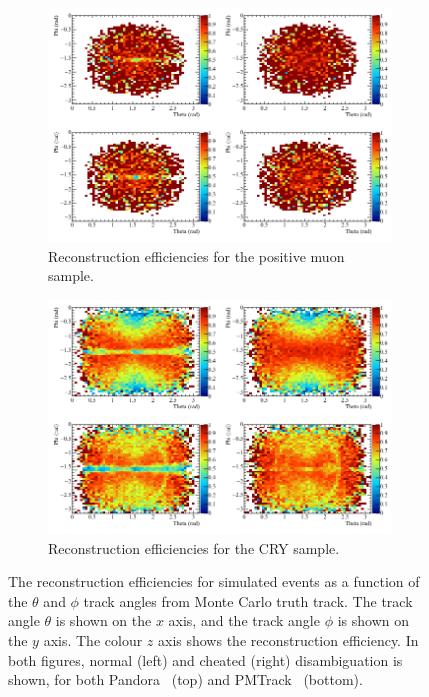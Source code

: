 \begin{figure}
  \centering
  \begin{subfigure}{0.8\textwidth}
    \centering
    \includegraphics[width=\textwidth]{Effic_AntiMuon_500V_All_PhiTheta}
    \caption{Reconstruction efficiencies for the positive muon sample.}
    \label{fig:SimEffic_ThetaPhi_AMu}
  \end{subfigure}
  \begin{subfigure}{0.8\textwidth}
    \centering
    \includegraphics[width=\textwidth]{Effic_Cosmics_500V_All_PhiTheta}
    \caption{Reconstruction efficiencies for the CRY sample.}
    \label{fig:SimEffic_ThetaPhi_CRY}
  \end{subfigure}
  \caption[The reconstruction efficiencies for simulated events as a function of the $\theta$ and $\phi$ track angles from Monte Carlo truth track.]
          {The reconstruction efficiencies for simulated events as a function of the $\theta$ and $\phi$ track angles from Monte Carlo truth track. The track angle $\theta$ is shown on the $x$ axis, and the track angle $\phi$ is shown on the $y$ axis. The colour $z$ axis shows the reconstruction efficiency. In both figures, normal (left) and cheated (right) disambiguation is shown, for both Pandora~\citep{Pandora} (top) and PMTrack~\citep{PMTrack} (bottom).}
          \label{fig:SimEffic_ThetaPhi}
\end{figure}

